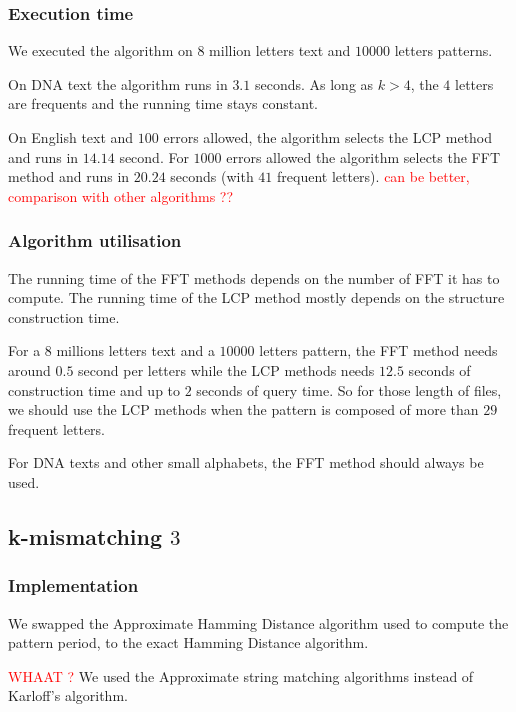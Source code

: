 \documentclass[preprint,12pt]{elsarticle}
\begin{document}
\subsubsection*{Execution time}

We executed the algorithm on $8$ million letters text and $10 000$ letters patterns.

On DNA text the algorithm runs in $3.1$ seconds.
As long as $k > 4$, the $4$ letters are frequents and the running time stays constant.

On English text and $100$ errors allowed, the algorithm selects the LCP method and runs in $14.14$ second.
For $1000$ errors allowed the algorithm selects the FFT method and runs in $20.24$ seconds
(with $41$ frequent letters).
\textcolor{red}{can be better, comparison with other algorithms ??}



\subsubsection*{Algorithm utilisation}
The running time of the FFT methods depends on the number of FFT it has to compute.
The running time of the LCP method mostly depends on the structure construction time.

For a $8$ millions letters text and a $10 000$ letters pattern,
the FFT method needs around $0.5$ second per letters
while the LCP methods needs $12.5$ seconds of construction time
and up to $2$ seconds of query time.
So for those length of files, we should use the LCP methods
when the pattern is composed of more than $29$ frequent letters.

For DNA texts and other small alphabets, the FFT method should always be used.





\subsection{k-mismatching $3$}

\subsubsection*{Implementation}
We swapped the Approximate Hamming Distance algorithm used to compute the pattern period,
to the exact Hamming Distance algorithm.


\textcolor{red}{WHAAT ?}
We used the Approximate string matching algorithms instead of Karloff's algorithm.
\end{document}
